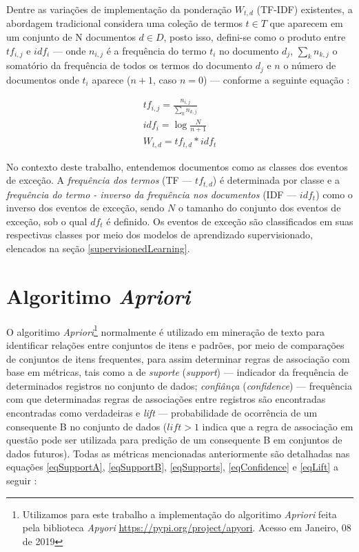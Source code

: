 \documentclass[
	12pt,				%
	oneside,			%
	a4paper,			%
	english,			%
	brazil				%
	]{abntex2ppgsi}
\begin{document}
{{Dentre as variações de implementação da ponderação $W_{t,d}$ (TF-IDF) existentes, a abordagem tradicional considera uma coleção de termos $t \in T$ que aparecem em um conjunto de N documentos $d \in D$, posto isso, defini-se como o produto entre $tf_{i,j}$ e $idf_i$ --- onde $n_{i,j}$ é a frequência do termo $t_i$ no documento $d_j$, $\sum_k n_{k,j}$ o somatório da frequência de todos os termos do documento $d_j$ e $n$ o número de documentos onde $t_i$ aparece ($n + 1$, caso $n = 0$) --- conforme a seguinte equação \cite{wu2018improved}:

\begin{equation}
\begin{split}
tf_{i,j} = \frac{n_{i,j}}{\sum_k n_{k,j}}
\\
idf_i = \log \frac{N}{n + 1}
\\
W_{t,d} = tf_{t,d} * idf_t
\end{split}
\end{equation}

No contexto deste trabalho, entendemos documentos como as classes dos eventos de exceção. A \emph{frequência dos termos} (TF --- $tf_{t,d}$) é determinada por classe e a \emph{frequência do termo - inverso da frequência nos documentos} (IDF --- $idf_t $) como o inverso dos eventos de exceção, sendo $N$ o tamanho do conjunto dos eventos de exceção, sob o qual $df_t$ é definido. Os eventos de exceção são classificados em suas respectivas classes por meio dos modelos de aprendizado supervisionado, elencados na seção \ref{supervisionedLearning}. 

\section{ Algoritimo \textit{Apriori}}
\label{apriori}

O algoritimo \textit{Apriori}\footnote{Utilizamos para este trabalho a implementação do algoritimo \textit{Apriori} feita pela biblioteca \textit{Apyori}  \url{https://pypi.org/project/apyori}. Acesso em Janeiro, 08 de 2019} normalmente é utilizado em mineração de texto para identificar relações entre conjuntos de itens e padrões, por meio de comparações de conjuntos de itens frequentes, para assim determinar regras de associação com base em métricas, tais como a de \textit{suporte} (\textit{support}) --- indicador da frequência de determinados registros no conjunto de dados; \textit{confiânça} (\textit{confidence}) --- frequência com que determinadas regras de associações entre registros são encontradas encontradas como verdadeiras e \textit{lift} --- probabilidade de ocorrência de um consequente B no conjunto de dados ($lift > 1$ indica que a regra de associação em questão pode ser utilizada para predição de um consequente B em conjuntos de dados futuros). Todas as métricas mencionadas anteriormente são detalhadas nas equações \ref{eqSupportA}, \ref{eqSupportB}, \ref{eqSupports}, \ref{eqConfidence} e  \ref{eqLift} a seguir  \cite{park2018apriori}:

}}
\end{document}
